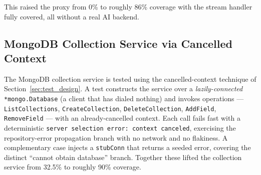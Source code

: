 This raised the proxy from 0\% to roughly 86\% coverage with the stream handler fully covered, all without a real AI backend.

\subsection{MongoDB Collection Service via Cancelled Context}

The MongoDB collection service is tested using the cancelled-context technique of Section~\ref{sec:test_design}. A test constructs the service over a \emph{lazily-connected} \texttt{*mongo.Database} (a client that has dialed nothing) and invokes operations --- \texttt{ListCollections}, \texttt{CreateCollection}, \texttt{DeleteCollection}, \texttt{AddField}, \texttt{RemoveField} --- with an already-cancelled context. Each call fails fast with a deterministic \texttt{server selection error: context canceled}, exercising the repository-error propagation branch with no network and no flakiness. A complementary case injects a \texttt{stubConn} that returns a seeded error, covering the distinct ``cannot obtain database'' branch. Together these lifted the collection service from 32.5\% to roughly 90\% coverage.

